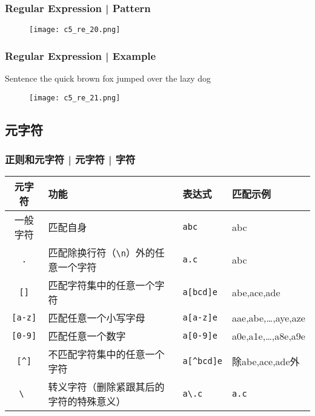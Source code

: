 \begin{frame}
  \frametitle{Regular Expression | Pattern}
  \begin{figure}
    \centering
    \texttt{[image: c5\_re\_20.png]}
  \end{figure}
\end{frame}

\begin{frame}
  \frametitle{Regular Expression | Example}
  \begin{block}{Sentence}
    the quick brown fox jumped over the lazy dog
  \end{block}
  \begin{figure}
    \centering
    \texttt{[image: c5\_re\_21.png]}
  \end{figure}
\end{frame}

\subsection{元字符}

\begin{frame}[fragile]
  \frametitle{正则和元字符 | 元字符 | \alert{字符}}
  \begin{table}
    \centering
    \begin{tabularx}{\textwidth}{cXll}
      \hline
      \rowcolor{blue!50}元字符 & 功能 & 表达式 & 匹配示例\\
      \hline
      一般字符 & 匹配自身 & \verb|abc| & abc\\
      \verb|.| & 匹配除换行符（\verb|\n|）外的任意一个字符 & \verb|a.c| & abc\\
      \verb|[]| & 匹配字符集中的任意一个字符 & \verb|a[bcd]e| & abe,ace,ade\\
      \verb|[a-z]| & 匹配任意一个小写字母 & \verb|a[a-z]e| & aae,abe,\ldots,aye,aze\\
      \verb|[0-9]| & 匹配任意一个数字 & \verb|a[0-9]e| & a0e,a1e,\ldots,a8e,a9e\\
      \verb|[^]| & 不匹配字符集中的任意一个字符 & \verb|a[^bcd]e| & 除abe,ace,ade外\\
      \verb|\ | & 转义字符（删除紧跟其后的字符的特殊意义） & \verb|a\.c| & \verb|a.c|\\
      \hline
    \end{tabularx}
  \end{table}
\end{frame}

